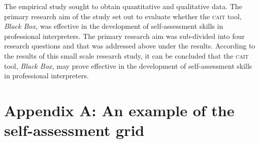 \documentclass[output=paper]{langsci/langscibook}
\begin{document}
The empirical study sought to obtain quantitative and qualitative data. The primary research aim of the study set out to evaluate whether the \textsc{cait} tool, \textit{Black Box,} was effective in the development of self-assessment skills in professional interpreters. The primary research aim was sub-divided into four research questions and that was addressed above under the results. According to the results of this small scale research study, it can be concluded that the \textsc{cait} tool, \textit{Black Box,} may prove effective in the development of self-assessment skills in professional interpreters. 

\section*{Appendix A: An example of the self-assessment grid}
\label{03:addendum:A}
\renewcommand{\arraystretch}{2}
\newlength{\tablewidth}\setlength{\tablewidth}{20cm}
\newlength{\cellwidth}\setlength{\cellwidth}{0.033\tablewidth}
\newlength{\rowwidth}\setlength{\rowwidth}{30\cellwidth}
\end{document}
